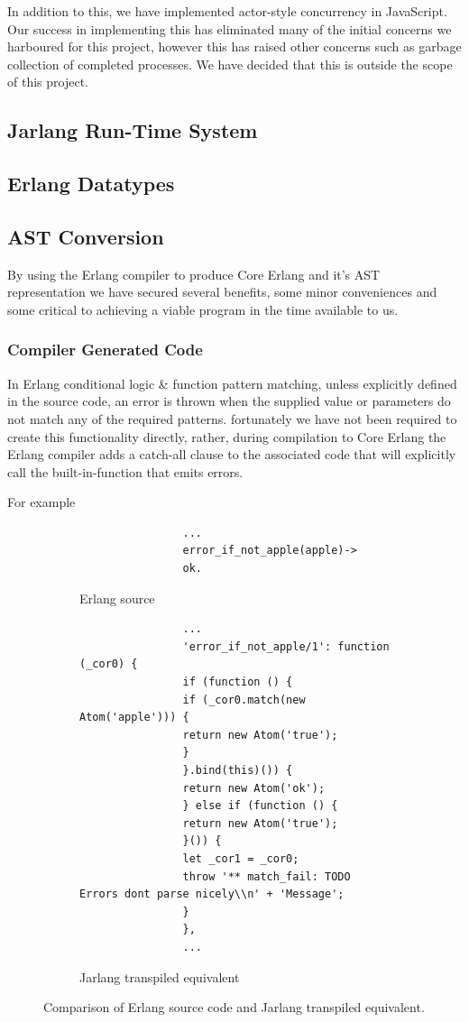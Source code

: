 \documentclass[twoside,12pt,titlepage,a4paper]{article}
\begin{document}
In addition to this, we have implemented actor-style concurrency in JavaScript. Our success in implementing this has eliminated many of the initial concerns we harboured for this project, however this has raised other concerns such as garbage collection of completed processes. We have decided that this is outside the scope of this project.

\subsection{Jarlang Run-Time System}
\subsection{Erlang Datatypes}
\subsection{AST Conversion}
	By using the Erlang compiler to produce Core Erlang and it's AST representation we have secured several benefits, some minor conveniences and some critical to achieving a viable program in the time available to us.
\subsubsection{Compiler Generated Code}
	In Erlang conditional logic \& function pattern matching, unless explicitly defined in the source code, an error is thrown when the supplied value or parameters do not match any of the required patterns. fortunately we have not been required to create this functionality directly, rather, during compilation to Core Erlang the Erlang compiler adds a catch-all clause to the associated code that will explicitly call the built-in-function that emits errors.
	
	For example
	\begin{figure}[htb]
		\centering
		\begin{subfigure}[t]{.5\linewidth}
			\centering         
				\begin{verbatim}
				...
				error_if_not_apple(apple)->
				ok.
				\end{verbatim}
			\caption{Erlang source}
		\end{subfigure}%
		\begin{subfigure}[t]{.5\linewidth}
			\centering
				\begin{verbatim}
				...
				'error_if_not_apple/1': function (_cor0) {
				if (function () {
				if (_cor0.match(new Atom('apple'))) {
				return new Atom('true');
				}
				}.bind(this)()) {
				return new Atom('ok');
				} else if (function () {
				return new Atom('true');
				}()) {
				let _cor1 = _cor0;
				throw '** match_fail: TODO Errors dont parse nicely\\n' + 'Message';
				}
				},
				...
				\end{verbatim}
			\caption{Jarlang transpiled equivalent}
		\end{subfigure}
		\caption{Comparison of Erlang source code and Jarlang transpiled equivalent.}
	\end{figure}
	
\end{document}
